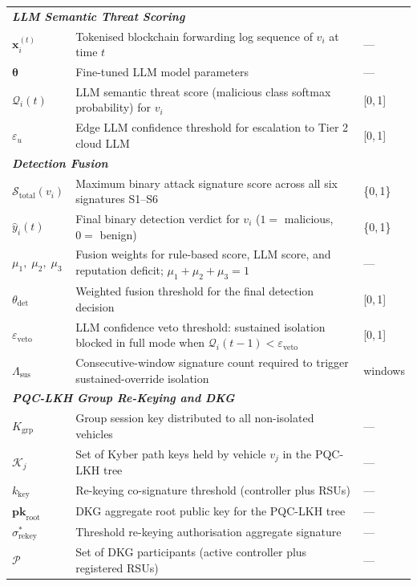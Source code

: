 \documentclass[12pt, a4paper]{report}
\begin{document}
\begin{longtable}{p{2.6cm} p{9.2cm} p{1.9cm}}
\multicolumn{3}{l}{\textit{\textbf{LLM Semantic Threat Scoring}}} \\[2pt]
$\mathbf{x}_i^{(t)}$ & Tokenised blockchain forwarding log sequence of $v_i$ at time $t$ & --- \\
$\boldsymbol{\theta}$ & Fine-tuned LLM model parameters & --- \\
$\mathcal{Q}_i(t)$ & LLM semantic threat score (malicious class softmax probability) for $v_i$ & [0,\,1] \\
$\varepsilon_u$ & Edge LLM confidence threshold for escalation to Tier 2 cloud LLM & [0,\,1] \\[6pt]

\multicolumn{3}{l}{\textit{\textbf{Detection Fusion}}} \\[2pt]
$\mathcal{S}_\mathrm{total}(v_i)$ & Maximum binary attack signature score across all six signatures S1--S6 & \{0,\,1\} \\
$\hat{y}_i(t)$ & Final binary detection verdict for $v_i$ ($1 =$ malicious, $0 =$ benign) & \{0,\,1\} \\
$\mu_1,\;\mu_2,\;\mu_3$ & Fusion weights for rule-based score, LLM score, and reputation deficit; $\mu_1+\mu_2+\mu_3=1$ & --- \\
$\theta_\mathrm{det}$ & Weighted fusion threshold for the final detection decision & [0,\,1] \\
$\varepsilon_{\mathrm{veto}}$ & LLM confidence veto threshold: sustained isolation blocked in full mode when $\mathcal{Q}_i(t-1) < \varepsilon_{\mathrm{veto}}$ & [0,\,1] \\
$\Lambda_{\mathrm{sus}}$ & Consecutive-window signature count required to trigger sustained-override isolation & windows \\[6pt]

\multicolumn{3}{l}{\textit{\textbf{PQC-LKH Group Re-Keying and DKG}}} \\[2pt]
$K_\mathrm{grp}$ & Group session key distributed to all non-isolated vehicles & --- \\
$\mathcal{K}_j$ & Set of Kyber path keys held by vehicle $v_j$ in the PQC-LKH tree & --- \\
$k_\mathrm{key}$ & Re-keying co-signature threshold (controller plus RSUs) & --- \\
$\mathbf{pk}_\mathrm{root}$ & DKG aggregate root public key for the PQC-LKH tree & --- \\
$\sigma_\mathrm{rekey}^*$ & Threshold re-keying authorisation aggregate signature & --- \\
$\mathcal{P}$ & Set of DKG participants (active controller plus registered RSUs) & --- \\

\end{longtable}
\end{document}

